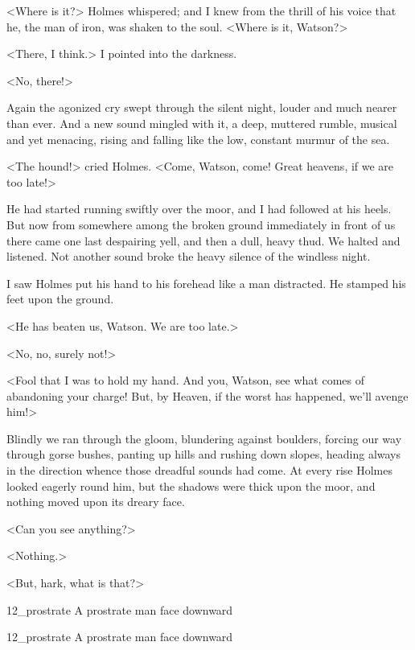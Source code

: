 <Where is it?> Holmes whispered; and I knew from the thrill of his voice that he, the man of iron, was shaken to the soul. <Where is it, Watson?>

<There, I think.> I pointed into the darkness.

<No, there!>

Again the agonized cry swept through the silent night, louder and much nearer than ever. And a new sound mingled with it, a deep, muttered rumble, musical and yet menacing, rising and falling like the low, constant murmur of the sea.

<The hound!> cried Holmes. <Come, Watson, come! Great heavens, if we are too late!>

He had started running swiftly over the moor, and I had followed at his heels. But now from somewhere among the broken ground immediately in front of us there came one last despairing yell, and then a dull, heavy thud. We halted and listened. Not another sound broke the heavy silence of the windless night.

I saw Holmes put his hand to his forehead like a man distracted. He stamped his feet upon the ground.

<He has beaten us, Watson. We are too late.>

<No, no, surely not!>

<Fool that I was to hold my hand. And you, Watson, see what comes of abandoning your charge! But, by Heaven, if the worst has happened, we'll avenge him!>

Blindly we ran through the gloom, blundering against boulders, forcing our way through gorse bushes, panting up hills and rushing down slopes, heading always in the direction whence those dreadful sounds had come. At every rise Holmes looked eagerly round him, but the shadows were thick upon the moor, and nothing moved upon its dreary face.

<Can you see anything?>

<Nothing.>

<But, hark, what is that?>

\begin{letter}
	\begin{bwbigpic}
			[1.0] 
		{12_prostrate}
		{A prostrate man face downward}
	\end{bwbigpic}
\end{letter}
\begin{a4}
	\begin{bwbigpic}
		[1.0] 
		{12_prostrate}
		{A prostrate man face downward}
	\end{bwbigpic}
\end{a4}

